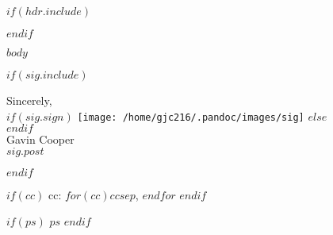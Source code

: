 \documentclass[$size$]{article}
\newcommand{\header}[0]{
	$if(hdr.include)$
		
	$endif$
    }
\begin{document}
\header

$body$

$if(sig.include)$
    \begin{minipage}[t]{6.5in}
    Sincerely,\\
    $if(sig.sign)$
        \vspace{-0.2in}\texttt{[image: /home/gjc216/.pandoc/images/sig]}
    $else$
        \\
    $endif$
    \\
    Gavin Cooper\\
    $sig.post$
    \end{minipage}
$endif$

$if(cc)$
    cc: $for(cc)$$cc$$sep$, $endfor$
$endif$

$if(ps)$
    $ps$
$endif$
\end{document}
